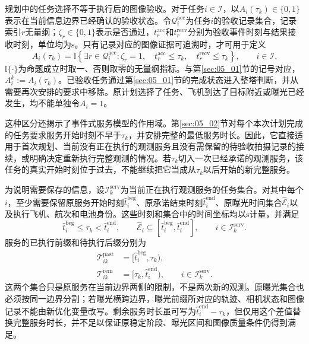 规划中的任务选择不等于执行后的图像验收。对于任务$i\in\mathcal I$，以$A_i(\tau_k)\in\{0,1\}$表示在当前信息边界已经确认的验收状态。令$\mathcal Q_i^{\mathrm{acc}}$为任务$i$的验收记录集合，记录索引$r$无量纲；$\zeta_r\in\{0,1\}$表示是否通过，$t_r^{\mathrm{acc}}$和$t_r^{\mathrm{recv}}$分别为验收事件时刻与结果接收时刻，单位均为$\mathrm s$。只有记录对应的图像证据可追溯时，才可用于定义
\begin{equation}
 A_i(\tau_k)=
 \mathbb I\!\left\{
 \exists r\in\mathcal Q_i^{\mathrm{acc}}:
 \zeta_r=1,\quad
 t_r^{\mathrm{acc}}\le\tau_k,\quad
 t_r^{\mathrm{recv}}\le\tau_k
 \right\},\qquad i\in\mathcal I.
 \label{s0507:accepted_history}
\end{equation}
$\mathbb I\{\cdot\}$为命题成立时取一、否则取零的无量纲指标。与第\ref{sec:05_01}节的记号对应，$A_i^k:=A_i(\tau_k)$。已验收任务通过第\ref{sec:05_01}节的完成状态进入整塔判断，并从需要再次安排的要求中移除。原计划选择了任务、飞机到达了目标附近或曝光已经发生，均不能单独令$A_i=1$。

这种区分还揭示了事件式服务模型的作用域。第\ref{sec:05_02}节对每个本次计划完成的任务要求服务开始时刻不早于$\tau_k$，并安排完整的最低服务时长。因此，它直接适用于首次规划、当前没有正在执行的观测服务且没有需保留的待验收拍摄记录的接续，或明确决定重新执行完整观测的情况。若$\tau_k$切入一次已经承诺的观测服务，该任务的真实开始时刻位于过去，不能继续把它当成从$\tau_k$以后开始的新完整服务。

为说明需要保存的信息，设$\mathcal I_k^{\mathrm{serv}}$为当前正在执行观测服务的任务集合。对其中每个$i$，至少需要保留原服务开始时刻$\widehat t_i^{\mathrm{beg}}$、原承诺结束时刻$\widehat t_i^{\mathrm{end}}$、原曝光时间集合$\widehat{\mathcal E}_i$以及执行飞机、航次和电池身份。这些时刻和集合中的时间坐标均以$\mathrm s$计量，并满足
\begin{equation}
 \widehat t_i^{\mathrm{beg}}\le\tau_k
 <\widehat t_i^{\mathrm{end}},\qquad
 \widehat{\mathcal E}_i\subseteq
 [\widehat t_i^{\mathrm{beg}},\widehat t_i^{\mathrm{end}}],
 \qquad i\in\mathcal I_k^{\mathrm{serv}}.
 \label{s0507:ongoing_service_record}
\end{equation}
服务的已执行前缀和待执行后缀分别为
\begin{align}
 \mathcal T_{ik}^{\mathrm{past}}
 &=[\widehat t_i^{\mathrm{beg}},\tau_k),
 \label{s0507:service_prefix}\\
 \mathcal T_{ik}^{\mathrm{rem}}
 &=[\tau_k,\widehat t_i^{\mathrm{end}}),
 \qquad i\in\mathcal I_k^{\mathrm{serv}}.
 \label{s0507:service_remainder}
\end{align}
这两个集合只是原服务在当前边界两侧的限制，不是两次新的观测。原曝光集合也必须按同一边界分割；若曝光横跨边界，曝光前缀所对应的轨迹、相机状态和图像记录不能由新优化变量改写。剩余服务时长虽可写为$\widehat t_i^{\mathrm{end}}-\tau_k$，但仅用这个差值替换完整服务时长，并不足以保证原稳定阶段、曝光区间和图像质量条件仍得到满足。

